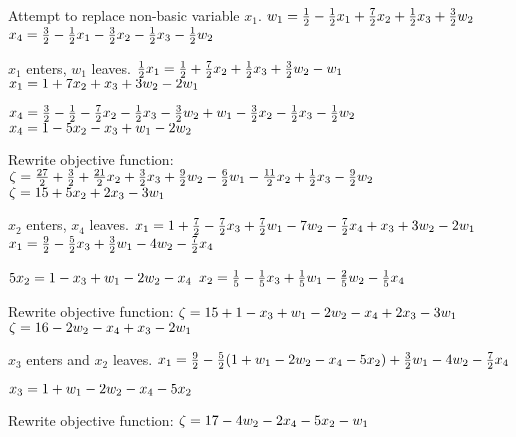 \documentclass[17pt]{extarticle}
\begin{document}
\bigskip Attempt to replace non-basic variable $x_1$.
$\\ w_1 = \frac{1}{2} - \frac{1}{2}x_1 + \frac{7}{2}x_2 + \frac{1}{2}x_3 + \frac{3}{2}w_2$
$\\ x_4 = \frac{3}{2} - \frac{1}{2}x_1 - \frac{3}{2}x_2 - \frac{1}{2}x_3 - \frac{1}{2}w_2$

\bigskip $x_1$ enters, $w_1$ leaves.
$\\ \frac{1}{2}x_1 = \frac{1}{2} + \frac{7}{2}x_2 + \frac{1}{2}x_3 + \frac{3}{2}w_2 - w_1$
$\\ x_1 = 1 + 7x_2 + x_3 + 3w_2 - 2w_1$

$\\ x_4 = \frac{3}{2} - \frac{1}{2} - \frac{7}{2}x_2 - \frac{1}{2}x_3 - \frac{3}{2}w_2 + w_1 - \frac{3}{2}x_2 - \frac{1}{2}x_3 - \frac{1}{2}w_2$
$\\ x_4 = 1 - 5x_2 - x_3 + w_1 - 2w_2$

\bigskip Rewrite objective function:
$\\\zeta = \frac{27}{2} + \frac{3}{2} + \frac{21}{2}x_2 + \frac{3}{2}x_3 + \frac{9}{2}w_2 - \frac{6}{2}w_1 - \frac{11}{2}x_2 + \frac{1}{2}x_3 - \frac{9}{2}w_2$
$\\\zeta = 15 + 5x_2 + 2x_3 - 3w_1$

\bigskip $x_2$ enters, $x_4$ leaves.
$\\ x_1 = 1 + \frac{7}{2} - \frac{7}{2}x_3 + \frac{7}{2}w_1 - 7w_2 - \frac{7}{2}x_4 + x_3 + 3w_2 - 2w_1$
$\\ x_1 = \frac{9}{2} - \frac{5}{2}x_3 + \frac{3}{2}w_1 - 4w_2 - \frac{7}{2}x_4$

$\\ 5x_2 = 1 - x_3 + w_1 - 2w_2 - x_4$
$\\ x_2 = \frac{1}{5} - \frac{1}{5}x_3 + \frac{1}{5}w_1 - \frac{2}{5}w_2 - \frac{1}{5}x_4$

\bigskip Rewrite objective function:
$\\\zeta = 15 + 1 - x_3 + w_1 - 2w_2 - x_4 + 2x_3 - 3w_1$
$\\\zeta = 16 - 2w_2 - x_4 + x_3 - 2w_1$

\bigskip $x_3$ enters and $x_2$ leaves.
$\\ x_1 = \frac{9}{2} - \frac{5}{2}(1 + w_1 - 2w_2 - x_4 - 5x_2) + \frac{3}{2}w_1 - 4w_2 - \frac{7}{2}x_4$

$\\ x_3 = 1 + w_1 - 2w_2 - x_4 - 5x_2$

\bigskip Rewrite objective function:
$\\\zeta = 17 - 4w_2 - 2x_4 - 5x_2 - w_1$
\end{document}
